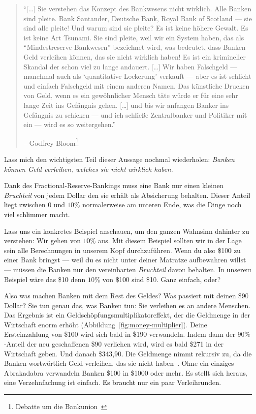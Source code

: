 \begin{quotation}\begin{samepage}
\enquote{[\ldots] Sie verstehen das Konzept des Bankwesens nicht wirklich. Alle
Banken sind pleite. Bank Santander, Deutsche Bank, Royal Bank of Scotland --- sie
sind alle pleite! Und warum sind sie pleite? Es ist keine höhere Gewalt. Es ist
keine Art Tsunami. Sie sind pleite, weil wir ein System haben, das als
“Mindestreserve Bankwesen” bezeichnet wird, was bedeutet, dass Banken Geld
verleihen können, das sie nicht wirklich haben! Es ist ein krimineller Skandal
der schon viel zu lange andauert. [\ldots]
Wir haben Falschgeld --- manchmal auch als \enquote{quantitative Lockerung}
verkauft --- aber es ist schlicht und einfach Falschgeld mit einem anderen
Namen. Das künstliche Drucken von Geld, wenn es ein gewöhnlicher Mensch täte
würde er für eine sehr lange Zeit ins Gefängnis gehen. [\ldots] und bis wir
anfangen Banker ins Gefängnis zu schicken — und ich schließe Zentralbanker und
Politiker mit ein — wird es so weitergehen.}
\begin{flushright} -- Godfrey Bloom\footnote{Debatte um die Bankunion~\cite{godfrey-bloom}}
\end{flushright}\end{samepage}\end{quotation}

Lass mich den wichtigsten Teil dieser Aussage nochmal wiederholen:
\textit{Banken können Geld verleihen, welches sie nicht wirklich haben.}

Dank des Fractional-Reserve-Bankings muss eine Bank nur einen kleinen \textit{Bruchteil}
von jedem Dollar den sie erhält als Absicherung behalten. Dieser Anteil liegt
zwischen $0$ und $10\%$ normalerweise am unteren Ende, was die Dinge noch viel
schlimmer macht.

Lass uns ein konkretes Beispiel anschauen, um den ganzen Wahnsinn dahinter zu
verstehen: Wir gehen von $10\%$ aus. Mit diesem Beispiel sollten wir in der Lage
sein alle Berechnungen in unserem Kopf durchzuführen.  Wenn du also \$100 zu
einer Bank bringst --- weil du es nicht unter deiner Matratze aufbewahren willst
--- müssen die Banken nur den vereinbarten \textit{Bruchteil} davon behalten. In
unserem Beispiel wäre das \$10 denn $10\%$ von \$100 sind \$10. Ganz einfach,
oder?

Also was machen Banken mit dem Rest des Geldes? Was passiert mit deinen \$90
Dollar? Sie tun genau das, was Banken tun: Sie verleihen es an andere Menschen.
Das Ergebnis ist ein Geldschöpfungsmultiplikatoreffekt, der die Geldmenge in der
Wirtschaft enorm erhöht (Abbildung~\ref{fig:money-multiplier}). Deine
Ersteinzahlung von \$100 wird sich bald in \$190 verwandeln. Indem dann der
$90\%$-Anteil der neu geschaffenen \$90 verliehen wird, wird es bald \$271 in
der Wirtschaft geben. Und danach \$343,90. Die Geldmenge nimmt rekursiv zu, da
die Banken wortwörtlich Geld verleihen, das sie nicht
haben~\cite{wiki:money-multiplier}. Ohne ein einziges Abrakadabra verwandeln
Banken \$100 in \$1000 oder mehr. Es stellt sich heraus, eine
Verzehnfachung ist einfach. Es braucht nur ein paar Verleihrunden.

